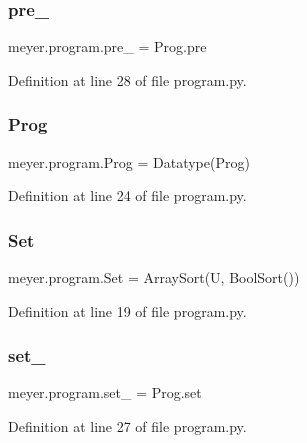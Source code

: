 \subsubsection{\texorpdfstring{pre\+\_\+}{pre\_}}
{\footnotesize\ttfamily meyer.\+program.\+pre\+\_\+ = Prog.\+pre}



Definition at line 28 of file program.\+py.

\mbox{\label{namespacemeyer_1_1program_a314c908a305b7a9bf8e7bc6b9cde2e02}} 
\subsubsection{\texorpdfstring{Prog}{Prog}}
{\footnotesize\ttfamily meyer.\+program.\+Prog = Datatype(\textquotesingle{}Prog\textquotesingle{})}



Definition at line 24 of file program.\+py.

\mbox{\label{namespacemeyer_1_1program_ac9c465b4f9426d61a87d653e9f26dc36}} 
\subsubsection{\texorpdfstring{Set}{Set}}
{\footnotesize\ttfamily meyer.\+program.\+Set = Array\+Sort(U, Bool\+Sort())}



Definition at line 19 of file program.\+py.

\mbox{\label{namespacemeyer_1_1program_aa5506eff84f20ed482dae9ad8b143b22}} 
\subsubsection{\texorpdfstring{set\+\_\+}{set\_}}
{\footnotesize\ttfamily meyer.\+program.\+set\+\_\+ = Prog.\+set}



Definition at line 27 of file program.\+py.


